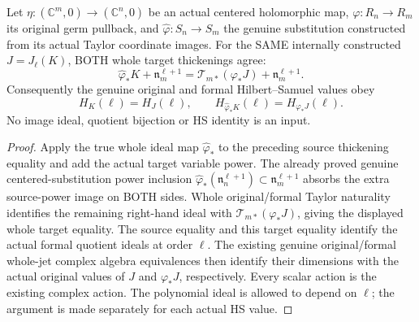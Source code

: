 \begin{theorem}
\label{hir:actual-formal-polynomial-jet-pullback-hs-identities}
Let $\eta:(\mathbb C^m,0)\to(\mathbb C^n,0)$ be an actual centered
holomorphic map, $\varphi:R_n\to R_m$ its original germ pullback,
and $\widehat\varphi:S_n\to S_m$ the genuine substitution constructed
from its actual Taylor coordinate images. For the SAME internally
constructed $J=J_\ell(K)$, BOTH whole target thickenings agree:
\[
 \widehat\varphi_*K+\mathfrak n_m^{\ell+1}
 =\mathcal T_{m*}(\varphi_*J)+\mathfrak n_m^{\ell+1}.
\]
Consequently the genuine original and formal Hilbert--Samuel values obey
\[
 H_K(\ell)=H_J(\ell),\qquad
 H_{\widehat\varphi_*K}(\ell)=H_{\varphi_*J}(\ell).
\]
No image ideal, quotient bijection or HS identity is an input.
\leanok
\end{theorem}
\begin{proof}
Apply the true whole ideal map $\widehat\varphi_*$ to the preceding
source thickening equality and add the actual target variable power.
The already proved genuine centered-substitution power inclusion
$\widehat\varphi_*(\mathfrak n_n^{\ell+1})\subset
\mathfrak n_m^{\ell+1}$ absorbs the extra source-power image on BOTH
sides. Whole original/formal Taylor naturality identifies the remaining
right-hand ideal with $\mathcal T_{m*}(\varphi_*J)$, giving the displayed
whole target equality. The source equality and this target equality
identify the actual formal quotient ideals at order $\ell$.
The existing genuine original/formal whole-jet complex algebra
equivalences then identify their dimensions with the actual original
values of $J$ and $\varphi_*J$, respectively. Every scalar action is
the existing complex action. The polynomial ideal is allowed to depend
on $\ell$; the argument is made separately for each actual HS value.
\end{proof}

